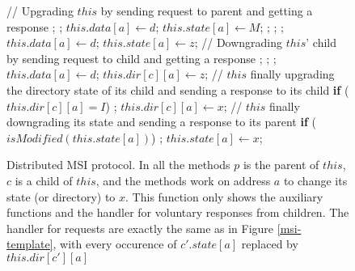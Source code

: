 \begin{figure}
\small

\begin{algorithmic}
\State // Upgrading $this$ by sending request to parent and getting a response
    \State \send{} ;
    \State \receive{} ;
    \State $this.data[a] \gets d$;
    \State $this.state[a] \gets M$;
  \ElsIf
  \State \send{} ;
  \State \receive{} ;
    \State \receive{} ;
    \State $this.data[a] \gets d$;
  \EndIf
  \State $this.state[a] \gets z$;
  \EndIf
\EndProc
\State // Downgrading $this$' child by sending request to child and getting a
response
  \State \send{} ;
  \State \receive{} ;
    \State \receive{} ;
    \State $this.data[a] \gets d$;
  \EndIf
  \State $this.dir[c][a] \gets z$;
  \EndWhile
\EndProc
\State // $this$ finally upgrading the directory state of its child and sending
a response to its child
  \State \textbf{if} ($this.dir[c][a] = I$)
  \State \;\;\;\; \send{} ;
  \State $this.dir[c][a] \gets x$;
\EndProc
\State // $this$ finally downgrading its state and sending a response to its
parent
  \State \textbf{if} ($isModified(this.state[a])$)
  \State \;\;\;\; \send{} ;
  \State $this.state[a] \gets x$;
\EndProc
\end{algorithmic}
\caption{Distributed MSI protocol. In all the methods $p$ is the parent of
$this$, $c$ is a child of $this$, and the methods work on address $a$ to change
its state (or directory) to $x$. This function only shows the auxiliary
functions and the handler for voluntary responses from children. The handler
for requests are exactly the same as in Figure \ref{msi-template}, with every
occurence of $c'.state[a]$ replaced by $this.dir[c'][a]$}
\label{realistic}
\end{figure}

